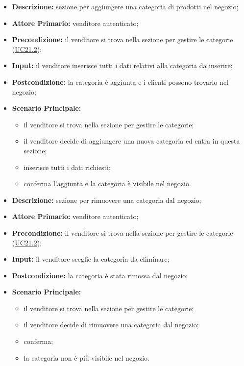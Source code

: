         \begin{itemize}
            \item \textbf{Descrizione:} sezione per aggiungere una categoria di prodotti nel negozio;
            \item \textbf{Attore Primario:} venditore autenticato;
            \item \textbf{Precondizione:} il venditore si trova nella sezione per gestire le categorie (\hyperref[sec:UC21.2]{\underline{UC21.2}});
            \item \textbf{Input:} il venditore inserisce tutti i dati relativi alla categoria da inserire;
            \item \textbf{Postcondizione:} la categoria è aggiunta e i clienti possono trovarlo nel negozio;
            \item \textbf{Scenario Principale:} 
                \begin{itemize}
                    \item il venditore si trova nella sezione per gestire le categorie;
                    \item il venditore decide di aggiungere una nuova categoria ed entra in questa sezione;
                    \item inserisce tutti i dati richiesti;
                    \item conferma l'aggiunta e la categoria è visibile nel negozio.
                \end{itemize}
        \end{itemize}
        \begin{itemize}
            \item \textbf{Descrizione:} sezione per rimuovere una categoria dal negozio;
            \item \textbf{Attore Primario:} venditore autenticato;
            \item \textbf{Precondizione:} il venditore si trova nella sezione per gestire le categorie (\hyperref[sec:UC21.2]{\underline{UC21.2}});
            \item \textbf{Input:} il venditore sceglie la categoria da eliminare;
            \item \textbf{Postcondizione:} la categoria è stata rimossa dal negozio;
            \item \textbf{Scenario Principale:} 
                \begin{itemize}
                    \item il venditore si trova nella sezione per gestire le categorie;
                    \item il venditore decide di rimuovere una categoria dal negozio;
                    \item conferma;
                    \item la categoria non è più visibile nel negozio.
                \end{itemize}
        \end{itemize}
